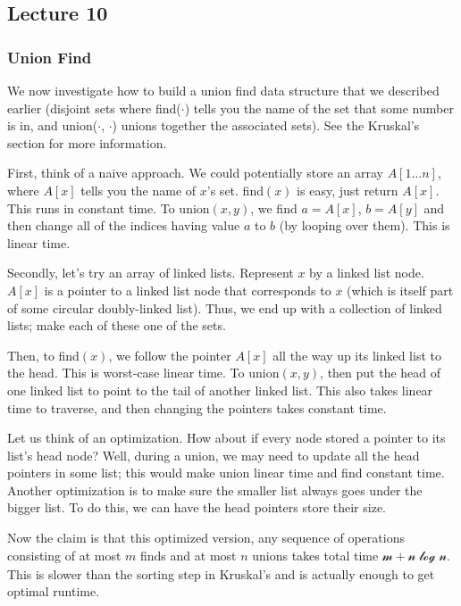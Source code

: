 \subsection{Lecture 10}

\subsubsection{Union Find}

We now investigate how to build a union find data structure that
we described earlier (disjoint sets where find($\cdot$) tells you
the name of the set that some number is in, and union($\cdot$, $\cdot$)
unions together the associated sets). See the Kruskal's section for more information.

First, think of a naive approach. We could potentially store an array $A[1\dots n]$, where $A[x]$ tells you the name of $x$'s set.
find$(x)$ is easy, just return $A[x]$. This runs in constant time. To union$(x, y)$, we find $a = A[x]$, $b = A[y]$
and then change all of the indices having value $a$ to $b$ (by looping over them). This is linear time.

Secondly, let's try an array of linked lists. Represent $x$ by a linked list node.
$A[x]$ is a pointer to a linked list node that corresponds to $x$ (which is itself part of some circular doubly-linked list).
Thus, we end up with a collection of linked lists; make each of these one of the sets.

Then, to find$(x)$, we follow the pointer $A[x]$ all the way up its linked list to the head. This is worst-case
linear time. To union$(x, y)$, then put the head of one linked list to point to the tail of another linked list.
This also takes linear time to traverse, and then changing the pointers takes constant time.

Let us think of an optimization. How about if every node stored a pointer to its list's head node?
Well, during a union, we may need to update all the head pointers in some list; this would make union linear time
and find constant time. Another optimization is to make sure the smaller list always goes under the bigger list.
To do this, we can have the head pointers store their size.

Now the claim is that this optimized version, any sequence of operations
consisting of at most $m$ finds and at most $n$ unions takes total time $\mathcal{m + n \log n}$.
This is slower than the sorting step in Kruskal's and is actually enough to get optimal runtime.

